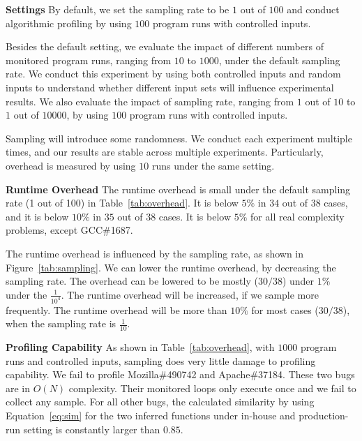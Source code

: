 \noindent\textbf{Settings}
By default, we set the sampling rate to be $1$ out of $100$ 
and conduct algorithmic profiling by using $100$ program runs with controlled inputs.  

Besides the default setting,
we evaluate the impact of different numbers of monitored program runs, 
ranging from $10$ to $1000$, under the default sampling rate.
We conduct this experiment by using both controlled inputs and random inputs 
to understand whether different input sets will influence experimental results.
We also evaluate the impact of sampling rate, ranging from $1$ out of $10$ to $1$ out of $10000$, 
by using $100$ program runs with controlled inputs.  

Sampling will introduce some randomness. 
We conduct each experiment multiple times, 
and our results are stable across multiple experiments. 
Particularly, overhead is measured by using $10$ runs under the same setting. 

\noindent\textbf{Runtime Overhead}
The runtime overhead is small under the default sampling rate (1 out of 100) 
in Table~\ref{tab:overhead}.
It is below $5\%$ in $34$ out of $38$ cases, 
and it is below $10\%$ in $35$ out of $38$ cases. 
It is below $5\%$ for all real complexity problems, 
except GCC\#1687. 

The runtime overhead is influenced by the sampling rate, 
as shown in Figure~\ref{tab:sampling}.
We can lower the runtime overhead, by decreasing the sampling rate.
The overhead can be lowered to be mostly ($30/38$) 
under $1\%$ under the $\frac{1}{10^4}$.
The runtime overhead will be increased, 
if we sample more frequently.
The runtime overhead will be more than $10\%$ for most cases ($30/38$), 
when the sampling rate is $\frac{1}{10}$.

\noindent\textbf{Profiling Capability}
As shown in Table~\ref{tab:overhead}, 
with $1000$ program runs and controlled inputs, 
sampling does very little damage to profiling capability. 
We fail to profile Mozilla\#490742 and Apache\#37184.
These two bugs are in $O(N)$ complexity. 
Their monitored loops only execute once 
and we fail to collect any sample.
For all other bugs, 
the calculated similarity by using Equation~\ref{eq:sim}
for the two inferred functions under 
in-house and production-run setting
is constantly larger than $0.85$.





















%
%





